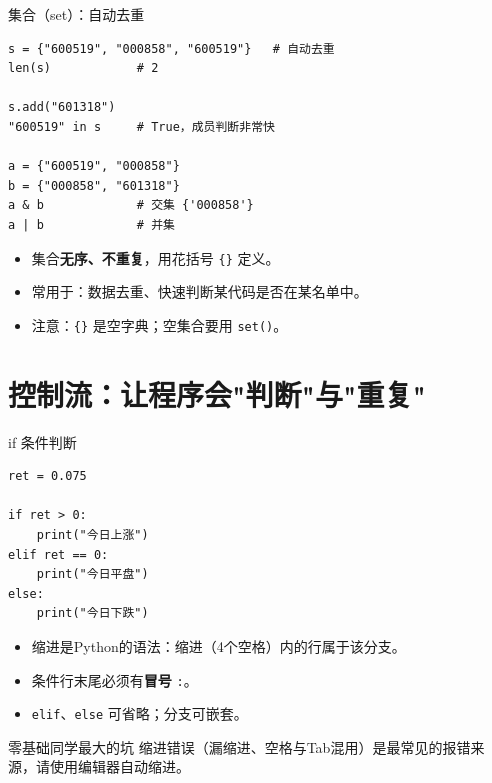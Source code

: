 \documentclass[9pt]{ctexbeamer}
\begin{document}
\begin{frame}[fragile]{集合（set）：自动去重}
	\begin{lstlisting}
s = {"600519", "000858", "600519"}   # 自动去重
len(s)            # 2

s.add("601318")
"600519" in s     # True，成员判断非常快

a = {"600519", "000858"}
b = {"000858", "601318"}
a & b             # 交集 {'000858'}
a | b             # 并集
\end{lstlisting}
	\begin{itemize}
		\item 集合\textbf{无序、不重复}，用花括号 \texttt{\{\}} 定义。
		\item 常用于：数据去重、快速判断某代码是否在某名单中。
		\item 注意：\texttt{\{\}} 是空字典；空集合要用 \texttt{set()}。
	\end{itemize}
\end{frame}


\section{控制流：让程序会"判断"与"重复"}

\begin{frame}[fragile]{if 条件判断}
	\begin{lstlisting}
ret = 0.075

if ret > 0:
    print("今日上涨")
elif ret == 0:
    print("今日平盘")
else:
    print("今日下跌")
\end{lstlisting}
	\begin{itemize}
		\item \alert{缩进是Python的语法}：缩进（4个空格）内的行属于该分支。
		\item 条件行末尾必须有\textbf{冒号} \texttt{:}。
		\item \texttt{elif}、\texttt{else} 可省略；分支可嵌套。
	\end{itemize}
	\begin{alertblock}{零基础同学最大的坑}
		缩进错误（漏缩进、空格与Tab混用）是最常见的报错来源，请使用编辑器自动缩进。
	\end{alertblock}
\end{frame}
\end{document}

